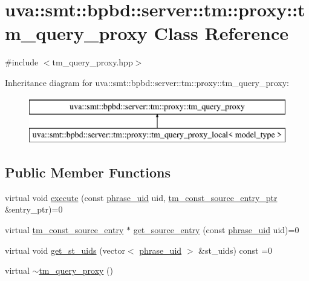 \hypertarget{classuva_1_1smt_1_1bpbd_1_1server_1_1tm_1_1proxy_1_1tm__query__proxy}{}\section{uva\+:\+:smt\+:\+:bpbd\+:\+:server\+:\+:tm\+:\+:proxy\+:\+:tm\+\_\+query\+\_\+proxy Class Reference}
\label{classuva_1_1smt_1_1bpbd_1_1server_1_1tm_1_1proxy_1_1tm__query__proxy}


{\ttfamily \#include $<$tm\+\_\+query\+\_\+proxy.\+hpp$>$}

Inheritance diagram for uva\+:\+:smt\+:\+:bpbd\+:\+:server\+:\+:tm\+:\+:proxy\+:\+:tm\+\_\+query\+\_\+proxy\+:\begin{figure}[H]
\begin{center}
\leavevmode
\includegraphics[height=2.000000cm]{classuva_1_1smt_1_1bpbd_1_1server_1_1tm_1_1proxy_1_1tm__query__proxy}
\end{center}
\end{figure}
\subsection*{Public Member Functions}
\begin{DoxyCompactItemize}
\item 
virtual void \hyperlink{classuva_1_1smt_1_1bpbd_1_1server_1_1tm_1_1proxy_1_1tm__query__proxy_a190e349330a4f58b51b756983ce246b9}{execute} (const \hyperlink{namespaceuva_1_1smt_1_1bpbd_1_1server_ad18d4cdf5504e76c22b0c124ff60b44f}{phrase\+\_\+uid} uid, \hyperlink{namespaceuva_1_1smt_1_1bpbd_1_1server_1_1tm_1_1models_a841bb11e4e9f70fbde7a8ca1ae533681}{tm\+\_\+const\+\_\+source\+\_\+entry\+\_\+ptr} \&entry\+\_\+ptr)=0
\item 
virtual \hyperlink{namespaceuva_1_1smt_1_1bpbd_1_1server_1_1tm_1_1models_a86b26049fe9aeb13a850852d897a2a77}{tm\+\_\+const\+\_\+source\+\_\+entry} $\ast$ \hyperlink{classuva_1_1smt_1_1bpbd_1_1server_1_1tm_1_1proxy_1_1tm__query__proxy_afa67ada737121e1a4c1a302c7f82de32}{get\+\_\+source\+\_\+entry} (const \hyperlink{namespaceuva_1_1smt_1_1bpbd_1_1server_ad18d4cdf5504e76c22b0c124ff60b44f}{phrase\+\_\+uid} uid)=0
\item 
virtual void \hyperlink{classuva_1_1smt_1_1bpbd_1_1server_1_1tm_1_1proxy_1_1tm__query__proxy_abe13dbef0b60b28709924789ff705235}{get\+\_\+st\+\_\+uids} (vector$<$ \hyperlink{namespaceuva_1_1smt_1_1bpbd_1_1server_ad18d4cdf5504e76c22b0c124ff60b44f}{phrase\+\_\+uid} $>$ \&st\+\_\+uids) const  =0
\item 
virtual \hyperlink{classuva_1_1smt_1_1bpbd_1_1server_1_1tm_1_1proxy_1_1tm__query__proxy_aa4d6c9cdd01f021dca4c339d4d6a481e}{$\sim$tm\+\_\+query\+\_\+proxy} ()
\end{DoxyCompactItemize}


